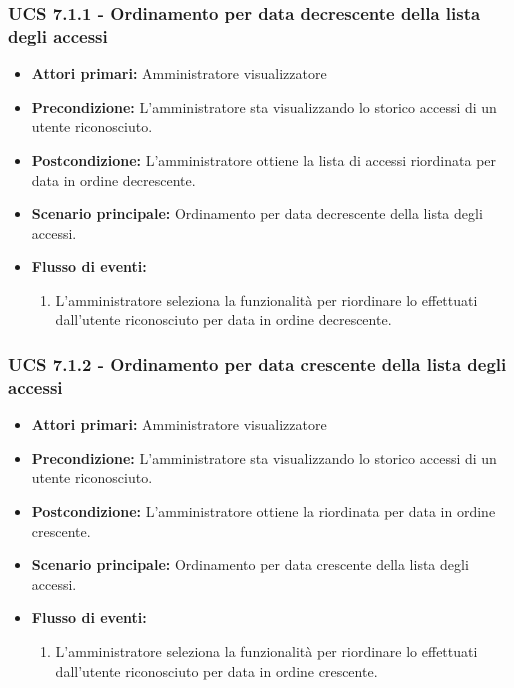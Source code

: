 \subsubsection{UCS 7.1.1 - Ordinamento per data decrescente della lista degli accessi}
\begin{itemize}
	\item \textbf{Attori primari:} Amministratore visualizzatore
	\item \textbf{Precondizione:} L'amministratore sta visualizzando lo storico accessi di un utente riconosciuto.
	\item \textbf{Postcondizione:} L'amministratore ottiene la lista di accessi riordinata per data in ordine decrescente.
	\item \textbf{Scenario principale:} Ordinamento per data decrescente della lista degli accessi.
	\item \textbf{Flusso di eventi:}
	\begin{enumerate}
		\item L'amministratore seleziona la funzionalità per riordinare lo  effettuati dall'utente riconosciuto per data in ordine decrescente.
	\end{enumerate}
\end{itemize}

\subsubsection{UCS 7.1.2 - Ordinamento per data crescente della lista degli accessi}
\begin{itemize}
	\item \textbf{Attori primari:} Amministratore visualizzatore
	\item \textbf{Precondizione:} L'amministratore sta visualizzando lo storico accessi di un utente riconosciuto.
	\item \textbf{Postcondizione:} L'amministratore ottiene la  riordinata per data in ordine crescente.
	\item \textbf{Scenario principale:} Ordinamento per data crescente della lista degli accessi.
	\item \textbf{Flusso di eventi:}
	\begin{enumerate}
		\item L'amministratore seleziona la funzionalità per riordinare lo  effettuati dall'utente riconosciuto per data in ordine crescente.
	\end{enumerate}
\end{itemize}

